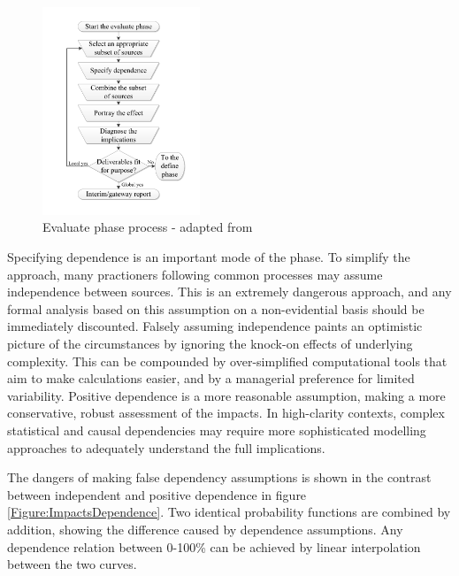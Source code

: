 \begin{figure}[!h]
  \centering
    \includegraphics[width = 0.42\textwidth]{./Figures/Evaluate.pdf} 
\caption{Evaluate phase process - adapted from \cite{chapman}}
\label{Figure:Evaluate}
\end{figure}

Specifying dependence is an important mode of the phase.
To simplify the approach, many practioners following common processes may assume independence between sources.
This is an extremely dangerous approach, and any formal analysis based on this assumption on a non-evidential basis should be immediately discounted.
Falsely assuming independence paints an optimistic picture of the circumstances by ignoring the knock-on effects of underlying complexity.
This can be compounded by over-simplified computational tools that aim to make calculations easier, and by a managerial preference for limited variability. 
Positive dependence is a more reasonable assumption, making a more conservative, robust assessment of the impacts. 
In high-clarity contexts, complex statistical and causal dependencies may require more sophisticated modelling approaches to adequately understand the full implications.

The dangers of making false dependency assumptions is shown in the contrast between independent and positive dependence in figure \ref{Figure:ImpactsDependence}.
Two identical probability functions are combined by addition, showing the difference caused by dependence assumptions.
Any dependence relation between 0-100\% can be achieved by linear interpolation between the two curves.

